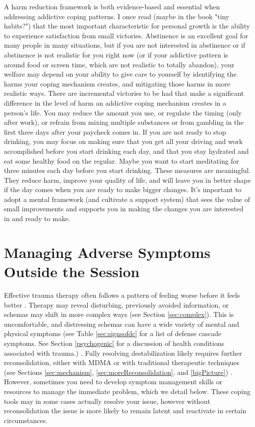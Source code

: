 \documentclass[12pt,letterpaper]{book}
\begin{document}
A harm reduction framework is both evidence-based and essential when addressing addictive coping patterns. I once read (maybe in the book "tiny habits?") that the most important characteristic for personal growth is the ability to experience satisfaction from small victories. Abstinence is an excellent goal for many people in many situations, but if you are not interested in abstinence or if abstinence is not realistic for you right now (or if your addictive pattern is around food or screen time, which are not realistic to totally abandon), your welfare may depend on your ability to give care to yourself by identifying the harms your coping mechanism creates, and mitigating those harms in more realistic ways. There are incremental victories to be had that make a significant difference in the level of harm an addictive coping mechanism creates in a person's life. You may reduce the amount you use, or regulate the timing (only after work), or refrain from mixing multiple substances or from gambling in the first three days after your paycheck comes in. If you are not ready to stop drinking, you may focus on making sure that you get all your driving and work accomplished before you start drinking each day, and that you stay hydrated and eat some healthy food on the regular. Maybe you want to start meditating for three minutes each day before you start drinking. These measures are meaningful. They reduce harm, improve your quality of life, and will leave you in better shape if the day comes when you are ready to make bigger changes. It's important to adopt a mental framework (and cultivate a support system) that sees the value of small improvements and supports you in making the changes you are interested in and ready to make.
\section{Managing Adverse Symptoms Outside the Session}
\label{sectionManagement}
Effective trauma therapy often follows a pattern of feeling worse before it feels better \cite{olthofDestabilization}. Therapy may reveal disturbing, previously avoided information, or schemas may shift in more complex ways (see Section \ref{sec:complex}). This is uncomfortable, and distressing schemas can have a wide variety of mental and physical symptoms (see Table \ref{sec:signsofdc} for a list of defense cascade symptoms. See Section \ref{psychogenic} for a discussion of health conditions associated with trauma.) \cite{kroenkeSomatic,henningsenSomatic}. Fully resolving destabilization likely requires further reconsolidation, either with MDMA or with traditional therapeutic techniques (see Sections \ref{sec:mechanism}, \ref{sec:moreReconsolidation}, and \ref{bigPicture}) \cite{hayes2020complex,friston2010free}. However, sometimes you need to develop symptom management skills or resources to manage the immediate problem, which we detail below. These coping tools may in some cases actually resolve your issue, however without reconsolidation the issue is more likely to remain latent and reactivate in certain circumstances.
\end{document}
